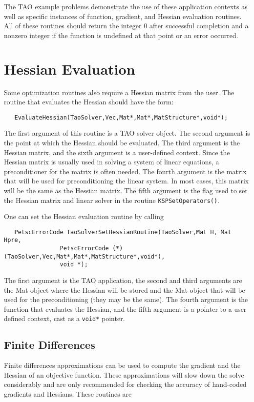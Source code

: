 The TAO example problems demonstrate the use of these application contexts
as well as specific instances of function, gradient, and Hessian 
evaluation routines.
All of these routines should return the integer $0$ after 
successful completion and a nonzero integer if the function
is undefined at that point or an error occurred.

\section{Hessian Evaluation}
\label{sec:matrixfree}
\label{sec:finitedifference}

Some optimization routines also require a Hessian matrix from the user.
The routine that evaluates the Hessian should have the form:
\begin{verbatim}
   EvaluateHessian(TaoSolver,Vec,Mat*,Mat*,MatStructure*,void*);
\end{verbatim}
\noindent
The first argument of this routine is a TAO solver object.  The second
argument is the point at which the Hessian should be evaluated.  The
third argument is the Hessian matrix, and the sixth argument is a
user-defined context.
Since the Hessian matrix is usually used in solving
a system of linear equations, a preconditioner for the matrix is often
needed.  The fourth argument is the matrix that will be used
for preconditioning the linear system.  In most cases, this
matrix will be the same as the Hessian matrix.  The fifth
argument is the flag used to set the Hessian matrix and
linear solver in the routine {\tt KSPSetOperators()}.

One can set the Hessian evaluation routine by calling 
\begin{verbatim}
   PetscErrorCode TaoSolverSetHessianRoutine(TaoSolver,Mat H, Mat Hpre,
                PetscErrorCode (*)(TaoSolver,Vec,Mat*,Mat*,MatStructure*,void*),
                void *);
\end{verbatim}
\noindent
The first argument is the TAO application, the second and third arguments
are the Mat object where the Hessian will be stored and the Mat object
that will be used for the preconditioning (they may be the same). The fourth 
argument is the function that evaluates the Hessian, 
and the fifth argument is a pointer to a user defined context,
cast as a {\tt void*} pointer.

\subsection{Finite Differences} 
Finite differences approximations can be used to compute the gradient and the
Hessian of an objective
function.  These approximations will slow down the solve considerably and are only 
recommended for checking the accuracy of hand-coded gradients and Hessians.
These routines are 


